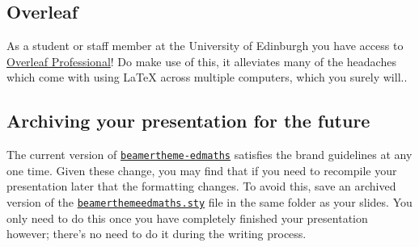 \documentclass[12pt]{article}
\newcommand\pkg[1]{\href{https://www.ctan.org/pkg/#1}{\color{teal}\lstinline{#1}}}
\begin{document}
\subsection{Overleaf}

As a student or staff member at the University of Edinburgh you have access to \href{https://www.ed.ac.uk/information-services/computing/desktop-personal/software/main-software-deals/other-software/overleaf}{Overleaf Professional}! Do make use of this, it alleviates many of the headaches which come with using \LaTeX{} across multiple computers, which you surely will..

\subsection{Archiving your presentation for the future}

The current version of \pkg{beamertheme-edmaths} satisfies the brand guidelines at any one time. Given these change, you may find that if you need to recompile your presentation later that the formatting changes. To avoid this, save an archived version of the \href{https://github.com/Foggalong/edinburgh-math-latex/blob/main/beamerthemeedmaths.sty}{\lstinline|beamerthemeedmaths.sty|} file in the same folder as your slides. You only need to do this once you have completely finished your presentation however; there's no need to do it during the writing process.
\end{document}
